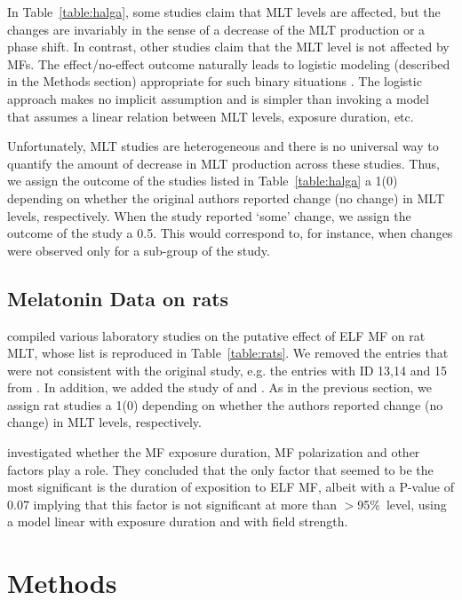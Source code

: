 \documentclass[letter]{article}
\begin{document}
In Table~\ref{table:halga}, some studies claim that MLT levels are affected, but the changes are invariably in the sense of a decrease of the MLT production or a phase shift.
In contrast, other studies claim that the MLT level is not affected by MFs.  The effect/no-effect outcome naturally leads to 
 logistic modeling (described in the Methods section) appropriate for such binary situations   \citep{Hosmer2000}. The logistic approach makes no implicit assumption and is simpler than invoking a model that assumes a linear relation between MLT levels, exposure duration, etc.

 Unfortunately, MLT studies are heterogeneous and there is no universal way to quantify the amount of decrease in MLT production across these studies. Thus,  we assign the outcome of the studies listed in Table~\ref{table:halga} a 1(0) depending on whether the original authors reported change (no change)  in MLT levels, respectively. When the study reported `some' change, we assign the outcome of the study a 0.5. This would correspond to, for instance, when changes were observed only for a sub-group of the study.


\subsection*{Melatonin Data on rats}
\label{section:rats}
 
\citet{Jahandideh2010} compiled various laboratory studies on the putative effect of ELF MF  on rat MLT,
whose list is reproduced in  Table~\ref{table:rats}. 
We  removed the entries that were not consistent with the original study, e.g. the entries with ID 13,14 and 15 from \citet{John1998}.
In addition, we added the study of \citet{Loscher1994} and \citet{Loscher1998}.
As in the previous section, we assign rat studies a 1(0) depending on whether the authors reported change (no change)  in  MLT levels, respectively.

\citet{Jahandideh2010} investigated whether the MF exposure duration, MF polarization and other factors play a role. They concluded that the only factor that seemed to be the most significant is the duration of exposition to ELF MF, albeit with a  P-value of 0.07 implying that this factor is not significant at more than $>$95\%\ level, using a model linear with exposure duration and with field strength.



\section*{Methods}
\end{document}
